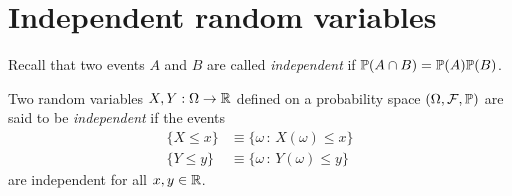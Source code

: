 
\section{Independent random variables}
Recall that two events $A$ and $B$ are called \emph{independent} if $\mathbb{P}(A\cap B)=\mathbb{P}(A)\mathbb{P}(B)$.

\begin{definition}
Two random variables $X,Y:\Omega\to\mathbb{R}$ defined on a probability space $(\Omega,\mathcal{F},\mathbb{P})$ are said to be \emph{independent} if the events 
\begin{align*}
\{X\leq x\} & \equiv \{\omega\,:\, X(\omega)\leq x\} \\
\{Y\leq y\} & \equiv \{\omega\,:\, Y(\omega)\leq y\}
\end{align*}
are independent for all $x,y\in\mathbb{R}$.
\end{definition}

